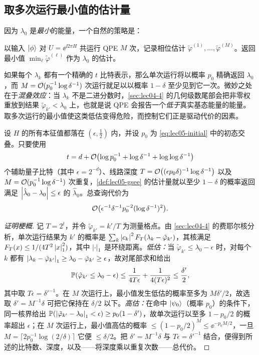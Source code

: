 \subsection*{取多次运行最小值的估计量}

因为 $\lambda_0$ 是\emph{最小}的能量，一个自然的策略是：

\begin{definition}
\label{def:lec05-gsee}
以输入 $\ket{\phi}$ 对 $U=\ee^{\ii 2\pi H}$ 共运行 QPE $M$ 次，记录相位估计 $\tilde\varphi^{(1)},\dots,\tilde\varphi^{(M)}$。返回最小值 $\min_\ell\tilde\varphi^{(\ell)}$ 作为 $\lambda_0$ 的估计。
\end{definition}

如果每个 $\lambda_k$ 都有一个精确的 $t$ 比特表示，那么单次运行将以概率 $p_0$ 精确返回 $\lambda_0$，而 $M=\mathcal{O}(p_0^{-1}\log\delta^{-1})$ 次运行就足以以概率 $1-\delta$ 至少见到它一次。微妙之处在于\emph{混叠效应}：当 $\lambda_k$ 不是二进分数时，\cref{sec:lec04-4} 的几何级数尾部会把非零权重放到结果 $\tilde\varphi_{k'}<\lambda_0$ 上，也就是说 QPE 会报告一个\emph{低于}真实基态能量的能量。取多次运行的最小值使这类低估变得危险，而控制它们正是驱动代价的因素。

\begin{theorem}[基态能量估计的依赖交叠的代价]
\label{thm:lec05-gsee}
设 $H$ 的所有本征值都落在 $(\epsilon,\tfrac12)$ 内，并设 $p_0$ 为 \eqref{eq:lec05-initial} 中的初态交叠。只要使用
\[
  t=d+\mathcal{O}\bigl(\log p_0^{-1}+\log\delta^{-1}+\log\log\delta^{-1}\bigr)
\]
个辅助量子比特（其中 $\epsilon=2^{-d}$）、线路深度
$T=\mathcal{O}\bigl((\epsilon p_0\delta)^{-1}\log\delta^{-1}\bigr)$ 以及
$M=\mathcal{O}(p_0^{-1}\log\delta^{-1})$ 次重复，\cref{def:lec05-gsee} 的估计量就以至少 $1-\delta$ 的概率返回满足 $\left\lvert \hat\lambda_0-\lambda_0 \right\rvert\le\epsilon$ 的 $\hat\lambda_0$。总查询代价为
\[
  \mathcal{O}\bigl(\epsilon^{-1}\delta^{-1}p_0^{-2}(\log\delta^{-1})^{2}\bigr).
\]
\end{theorem}

\begin{proof}[证明梗概]
记 $T=2^{t}$，并令 $\tilde\varphi_{k'}=k'/T$ 为测量格点。由 \cref{sec:lec04-4} 的费耶尔核分析，单次运行结果为 $k'$ 的概率是 $\sum_k\left\lvert c_k \right\rvert^2 F_T(\lambda_k-\tilde\varphi_{k'})$，其核满足 $F_T(x)\le 1/(4T^2\left\lvert x \right\rvert_1^2)$，其中 $\left\lvert \cdot \right\rvert_1$ 是环绕距离。\emph{低估：}当
$\tilde\varphi_{k'}\le\lambda_0-\epsilon$ 时，对每个 $k$ 都有
$\left\lvert \lambda_k-\tilde\varphi_{k'} \right\rvert_1\ge\lambda_0-\tilde\varphi_{k'}\ge\epsilon$，故对尾部求和给出
\[
  \mathbb{P}(\tilde\varphi_{k'}\le\lambda_0-\epsilon)
  \le\frac{1}{4T\epsilon}+\frac{1}{4(T\epsilon)^{2}}\le\frac{\delta'}{2},
\]
其中取 $T\epsilon=\delta'^{-1}$。在 $M$ 次运行上，最小值发生低估的概率至多为 $M\delta'/2$，故选取 $\delta'=M^{-1}\delta$ 可把它保持在 $\delta/2$ 以下。\emph{高估：}在命中 $\ket{\psi_0}$（概率 $p_0$）的条件下，同一核界给出
$\mathbb{P}(\left\lvert \tilde\varphi_{k'}-\lambda_0 \right\rvert_1<\epsilon)\ge p_0(1-\delta')$，故单次运行以至多 $1-p_0/2$ 的概率超出 $\epsilon$；在 $M$ 次运行上，最小值高估的概率
$\le(1-p_0/2)^M\le\ee^{-p_0 M/2}$，一旦
$M=\lceil 2p_0^{-1}\log(2/\delta)\rceil$ 它便 $\le\delta/2$。把 $\delta'=M^{-1}\delta$ 与
$T\epsilon=\delta'^{-1}$ 结合，便得到所述的比特数、深度，以及——将深度乘以重复次数——总代价。
\end{proof}

